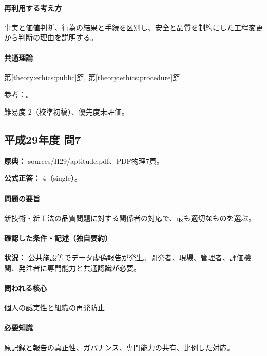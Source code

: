 \paragraph{再利用する考え方} 事実と価値判断、行為の結果と手続を区別し、安全と品質を制約にした工程変更から判断の理由を説明する。

\paragraph{共通理論} \hyperref[theory:ethics:public]{第\ref*{theory:ethics:public}節}, \hyperref[theory:ethics:procedure]{第\ref*{theory:ethics:procedure}節}

\par 参考：\cite{ipej_ethics2011}。

\par 難易度 2（校準初稿）、優先度未評価。

\subsection{平成29年度 問7}
\label{q:h29-reg-apt-07}

\noindent\textbf{原典：} sources/H29/aptitude.pdf、PDF物理7頁。

\textbf{公式正答：} 4（single）。

\paragraph{問題の要旨} 新技術・新工法の品質問題に対する関係者の対応で、最も適切なものを選ぶ。

\paragraph{確認した条件・記述（独自要約）}\mbox{}\par

\noindent\textbf{状況：} 公共施設等でデータ虚偽報告が発生。開発者、現場、管理者、評価機関、発注者に専門能力と共通認識が必要。\par

\paragraph{問われる核心} 個人の誠実性と組織の再発防止

\paragraph{必要知識} 原記録と報告の真正性、ガバナンス、専門能力の共有、比例した対応。

